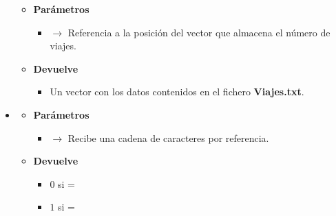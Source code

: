 \begin{itemize}
\begin{itemize}
		\item \textbf{Parámetros}
		\begin{itemize}
			\item {} $\rightarrow$ Referencia a la posición del vector que almacena el número de viajes.
		\end{itemize}
		\item \textbf{Devuelve}
		\begin{itemize}
			\item Un vector con los datos contenidos en el fichero \textbf{Viajes.txt}.
		\end{itemize}
	\end{itemize}
	\item\label{def:perfilusuario}
	\begin{itemize}
		\item \textbf{Parámetros}
		\begin{itemize}
			\item {} $\rightarrow$ Recibe una cadena de caracteres por referencia.
			
		\end{itemize}
		\item \textbf{Devuelve}
		\begin{itemize}
			\item $0$ si  = 
			\item $1$ si  = 
		\end{itemize}
	\end{itemize}
\end{itemize}
\newpage




